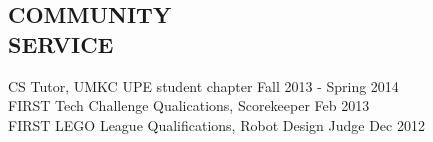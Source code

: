 \documentclass[line,margin]{res}
\begin{document}
\begin{resume}
\section{COMMUNITY \\ SERVICE}  
            	CS Tutor, UMKC UPE student chapter  \hfill Fall 2013 - Spring 2014 \\
                FIRST Tech Challenge Qualications, Scorekeeper \hfill Feb 2013 \\
		FIRST LEGO League Qualifications, Robot Design Judge \hfill Dec 2012  \\
\end{resume}
\end{document}
